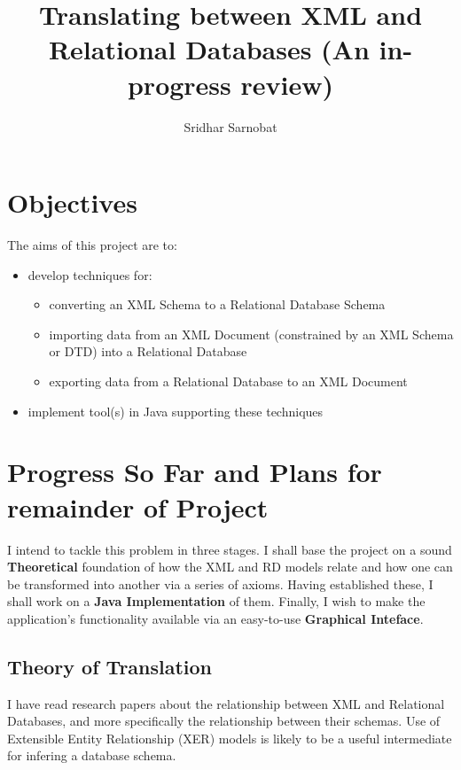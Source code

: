 \documentclass[a4paper]{article}
\begin{document}
\title{Translating between XML and Relational Databases (An in-progress review)}
\author{Sridhar Sarnobat}
\maketitle

\section{Objectives}

The aims of this project are to:
\begin{itemize}
\item 
develop techniques for: 
\begin{itemize}
\item converting an XML Schema to a Relational Database Schema
\item importing data from an XML Document (constrained by an XML Schema or DTD) into a Relational Database 
\item exporting data from a Relational Database to an XML Document
\end{itemize}
\item implement tool(s) in Java supporting these techniques
\end{itemize}

\section{Progress So Far and Plans for remainder of Project}

I intend to tackle this problem in three stages. I shall base the project 
on a sound {\bf Theoretical} foundation of how the XML and RD models 
relate and how one can be transformed into another via a series of axioms. 
Having established these, I shall work on a {\bf Java Implementation} of 
them. Finally, I wish to make the application's functionality available 
via an easy-to-use {\bf Graphical Inteface}.

\subsection{Theory of Translation}

I have read research papers about the relationship between XML and Relational Databases, and more specifically the relationship between their schemas. Use of Extensible Entity Relationship (XER) models is likely to be a useful intermediate for infering a database schema.
\end{document}
